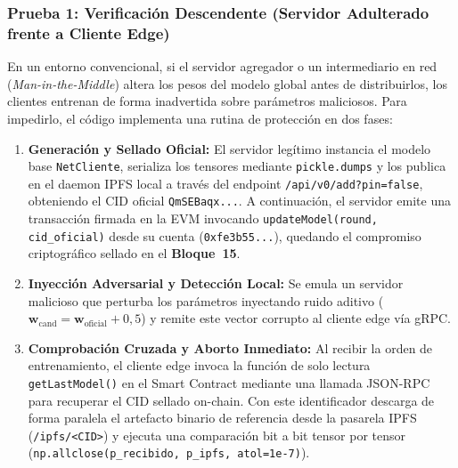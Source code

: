 \subsubsection{Prueba 1: Verificación Descendente (Servidor Adulterado frente a Cliente Edge)}
\label{subsubsec:ataque_descendente}
En un entorno convencional, si el servidor agregador o un intermediario en red (\textit{Man-in-the-Middle}) altera los pesos del modelo global antes de distribuirlos, los clientes entrenan de forma inadvertida sobre parámetros maliciosos. Para impedirlo, el código implementa una rutina de protección en dos fases:
\begin{enumerate}
    \item \textbf{Generación y Sellado Oficial:} El servidor legítimo instancia el modelo base \texttt{NetCliente}, serializa los tensores mediante \texttt{pickle.dumps} y los publica en el daemon IPFS local a través del endpoint \texttt{/api/v0/add?pin=false}, obteniendo el CID oficial \texttt{QmSEBaqx...}. A continuación, el servidor emite una transacción firmada en la EVM invocando \texttt{updateModel(round, cid\_oficial)} desde su cuenta (\texttt{0xfe3b55...}), quedando el compromiso criptográfico sellado en el \textbf{Bloque~15}.
    \item \textbf{Inyección Adversarial y Detección Local:} Se emula un servidor malicioso que perturba los parámetros inyectando ruido aditivo ($\mathbf{w}_{\text{cand}} = \mathbf{w}_{\text{oficial}} + 0{,}5$) y remite este vector corrupto al cliente edge vía gRPC.
    \item \textbf{Comprobación Cruzada y Aborto Inmediato:} Al recibir la orden de entrenamiento, el cliente edge invoca la función de solo lectura \texttt{getLastModel()} en el Smart Contract mediante una llamada JSON-RPC para recuperar el CID sellado on-chain. Con este identificador descarga de forma paralela el artefacto binario de referencia desde la pasarela IPFS (\texttt{/ipfs/<CID>}) y ejecuta una comparación bit a bit tensor por tensor (\texttt{np.allclose(p\_recibido, p\_ipfs, atol=1e-7)}).
\end{enumerate}

